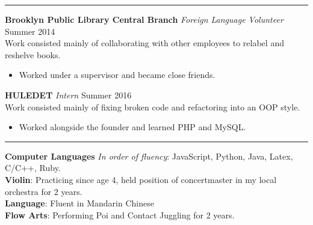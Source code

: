 \documentclass[11pt, letter, sans]{moderncv}
\begin{document}
  \vspace{0.1cm} \hrule \vspace{0.2cm}
  \noindent\textbf{Brooklyn Public Library Central Branch}\textit{ Foreign Language Volunteer}
  \hfill Summer 2014\\
  Work consisted mainly of collaborating with other employees to relabel and reshelve books.
  \begin{itemize}[label={--},noitemsep, topsep=0pt]
    \item Worked under a supervisor and became close friends.
  \end{itemize}
  \noindent\textbf{HULEDET}\textit{ Intern }
  \hfill Summer 2016\\
  Work consisted mainly of fixing broken code and refactoring into an OOP style.
  \begin{itemize}[label={--},noitemsep, topsep=0pt]
    \item Worked alongside the founder and learned PHP and MySQL.
  \end{itemize}



  \vspace{0.1cm} \hrule \vspace{0.2cm}
  \noindent\textbf{Computer Languages}\textit{ In order of fluency}:
  JavaScript, Python, Java, Latex, C/C++, Ruby.\\
  \textbf{Violin}: Practicing since age 4, held position of concertmaster in my local orchestra for 2 years.\\
  \noindent\textbf{Language}: Fluent in Mandarin Chinese\\
  \textbf{Flow Arts}: Performing Poi and Contact Juggling for 2 years.\\
\end{document}
